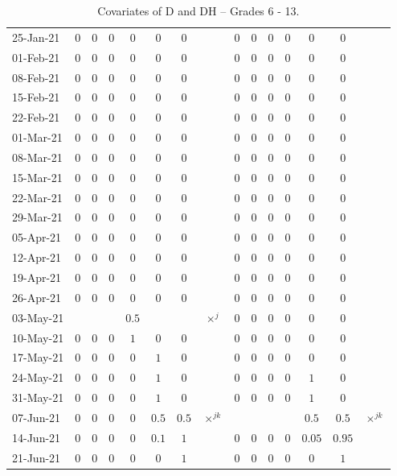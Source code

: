 \documentclass[fleqn,10pt]{wlscirep}
\begin{document}
\begin{table}
\begin{center}
{\begin{tabular}{l|ccccccc|ccccccc}
25-Jan-21	&$0$	&$0$	&$0$	&$0$	&$0$	&$0$	&		&$0$	&$0$	&$0$	&$0$	&$0$	&$0$	&	\\
01-Feb-21	&$0$	&$0$	&$0$	&$0$	&$0$	&$0$	&		&$0$	&$0$	&$0$	&$0$	&$0$	&$0$	&	\\
08-Feb-21	&$0$	&$0$	&$0$	&$0$	&$0$	&$0$	&		&$0$	&$0$	&$0$	&$0$	&$0$	&$0$	&	\\
15-Feb-21	&$0$	&$0$	&$0$	&$0$	&$0$	&$0$	&		&$0$	&$0$	&$0$	&$0$	&$0$	&$0$	&	\\
22-Feb-21	&$0$	&$0$	&$0$	&$0$	&$0$	&$0$	&		&$0$	&$0$	&$0$	&$0$	&$0$	&$0$	&	\\
01-Mar-21	&$0$	&$0$	&$0$	&$0$	&$0$	&$0$	&		&$0$	&$0$	&$0$	&$0$	&$0$	&$0$	&	\\
08-Mar-21	&$0$	&$0$	&$0$	&$0$	&$0$	&$0$	&		&$0$	&$0$	&$0$	&$0$	&$0$	&$0$	&	\\
15-Mar-21	&$0$	&$0$	&$0$	&$0$	&$0$	&$0$	&		&$0$	&$0$	&$0$	&$0$	&$0$	&$0$	&	\\
22-Mar-21	&$0$	&$0$	&$0$	&$0$	&$0$	&$0$	&		&$0$	&$0$	&$0$	&$0$	&$0$	&$0$	&	\\
29-Mar-21	&$0$	&$0$	&$0$	&$0$	&$0$	&$0$	&		&$0$	&$0$	&$0$	&$0$	&$0$	&$0$	&	\\
05-Apr-21	&$0$	&$0$	&$0$	&$0$	&$0$	&$0$	&		&$0$	&$0$	&$0$	&$0$	&$0$	&$0$	&	\\
12-Apr-21	&$0$	&$0$	&$0$	&$0$	&$0$	&$0$	&		&$0$	&$0$	&$0$	&$0$	&$0$	&$0$	&	\\
19-Apr-21	&$0$	&$0$	&$0$	&$0$	&$0$	&$0$	&		&$0$	&$0$	&$0$	&$0$	&$0$	&$0$	&	\\
26-Apr-21	&$0$	&$0$	&$0$	&$0$	&$0$	&$0$	&		&$0$	&$0$	&$0$	&$0$	&$0$	&$0$	&	\\
03-May-21	&	&	&	&$0.5$	&	&	&$\times^{j}$		&$0$	&$0$	&$0$	&$0$	&$0$	&$0$	&	\\
10-May-21	&$0$	&$0$	&$0$	&$1$	&$0$	&$0$	&		&$0$	&$0$	&$0$	&$0$	&$0$	&$0$	&	\\
17-May-21	&$0$	&$0$	&$0$	&$0$	&$1$	&$0$	&		&$0$	&$0$	&$0$	&$0$	&$0$	&$0$	&	\\
24-May-21	&$0$	&$0$	&$0$	&$0$	&$1$	&$0$	&		&$0$	&$0$	&$0$	&$0$	&$1$	&$0$	&	\\
31-May-21	&$0$	&$0$	&$0$	&$0$	&$1$	&$0$	&		&$0$	&$0$	&$0$	&$0$	&$1$	&$0$	&	\\
07-Jun-21	&$0$	&$0$	&$0$	&$0$	&$0.5$	&$0.5$	&$\times^{jk}$		&	&	&	&	&$0.5$	&$0.5$	&$\times^{jk}$	\\
14-Jun-21	&$0$	&$0$	&$0$	&$0$	&$0.1$	&$1$	&		&$0$	&$0$	&$0$	&$0$	&$0.05$	&$0.95$	&	\\
21-Jun-21	&$0$	&$0$	&$0$	&$0$	&$0$	&$1$	&		&$0$	&$0$	&$0$	&$0$	&$0$	&$1$	&	\\
\end{tabular}																
													
}
\caption{Covariates of D and DH -- Grades 6 - 13.}
\label{tab:cov2}																						\end{center}																	 
\end{table}															
\end{document}
